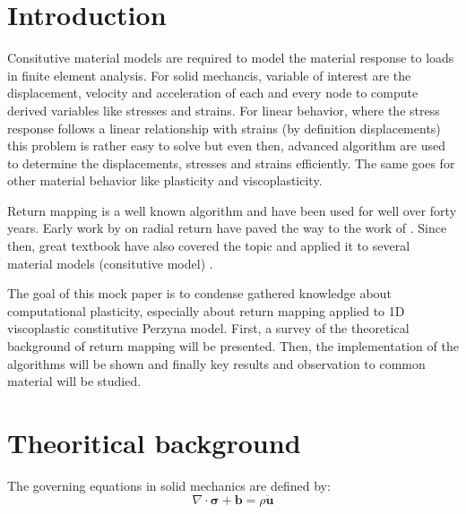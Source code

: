 \documentclass[final,5p,times,twocolumn]{elsarticle}
\begin{document}

\section{Introduction}
\label{sect:intro}
Consitutive material models are required to model the material response to loads in finite element analysis. For solid mechancis, variable of interest are the displacement, velocity and acceleration of each and every node to compute derived variables like stresses and strains. For linear behavior, where the stress response follows a linear relationship with strains (by definition displacements) this problem is rather easy to solve but even then, advanced algorithm are used to determine the displacements, stresses and strains efficiently. The same goes for other material behavior like plasticity and viscoplasticity.

Return mapping is a well known algorithm and have been used for well over forty years. Early work by \cite{Krieg1977RadialReturn} on radial return have paved the way to the work of \cite{Ortiz1985ElastoplasticIntegration}. Since then, great textbook have also covered the topic and applied it to several material models (consitutive model)\cite{Simo1998Computational} \cite{MACrisfield2012}.

The goal of this mock paper is to condense gathered knowledge about computational plasticity, especially about return mapping applied to 1D viscoplastic constitutive Perzyna model. First, a survey of the theoretical background of return mapping will be presented. Then, the implementation of the algorithms will be shown and finally key results and observation to common material will be studied.

\section{Theoritical background}
\label{sect:theoriticalbackground}
The governing equations in solid mechanics are defined by:
\begin{equation}
  \nabla \cdot \boldsymbol{\sigma} + \boldsymbol{b} = \rho \ddot{\boldsymbol{u}} \label{eq:equilibrium}
\end{equation}
\end{document}

